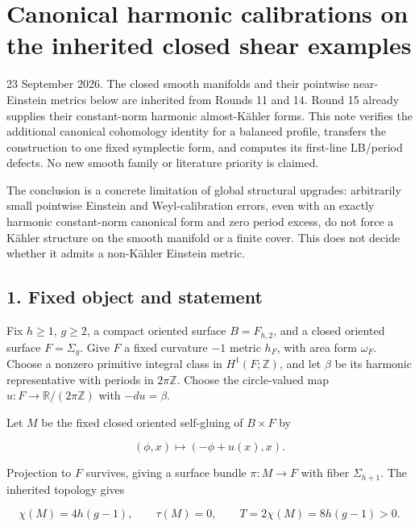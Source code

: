 \documentclass[
  11pt,
]{article}
\author{}
\date{23 September 2026}
\begin{document}
\hypertarget{canonical-harmonic-calibrations-on-the-inherited-closed-shear-examples}{%
\section{Canonical harmonic calibrations on the inherited closed shear
examples}\label{canonical-harmonic-calibrations-on-the-inherited-closed-shear-examples}}

23 September 2026. The closed smooth manifolds and their pointwise
near-Einstein metrics below are inherited from Rounds 11 and 14. Round
15 already supplies their constant-norm harmonic almost-Kähler forms.
This note verifies the additional canonical cohomology identity for a
balanced profile, transfers the construction to one fixed symplectic
form, and computes its first-line LB/period defects. No new smooth
family or literature priority is claimed.

The conclusion is a concrete limitation of global structural upgrades:
arbitrarily small pointwise Einstein and Weyl-calibration errors, even
with an exactly harmonic constant-norm canonical form and zero period
excess, do not force a Kähler structure on the smooth manifold or a
finite cover. This does not decide whether it admits a non-Kähler
Einstein metric.

\hypertarget{fixed-object-and-statement}{%
\subsection{1. Fixed object and
statement}\label{fixed-object-and-statement}}

Fix \(h\ge1\), \(g\ge2\), a compact oriented surface \(B=F_{h,2}\), and
a closed oriented surface \(F=\Sigma_g\). Give \(F\) a fixed curvature
\(-1\) metric \(h_F\), with area form \(\omega_F\). Choose a nonzero
primitive integral class in \(H^1(F;\mathbb Z)\), and let \(\beta\) be
its harmonic representative with periods in \(2\pi\mathbb Z\). Choose
the circle-valued map \(u:F\to\mathbb R/(2\pi\mathbb Z)\) with
\(-du=\beta\).

Let \(M\) be the fixed closed oriented self-gluing of \(B\times F\) by

\[
 (\phi,x)\longmapsto(-\phi+u(x),x).
 \tag{1}
\]

Projection to \(F\) survives, giving a surface bundle \(\pi:M\to F\)
with fiber \(\Sigma_{h+1}\). The inherited topology gives

\[
 \chi(M)=4h(g-1),\qquad \tau(M)=0,\qquad
 T=2\chi(M)=8h(g-1)>0.
 \tag{2}
\]
\end{document}

